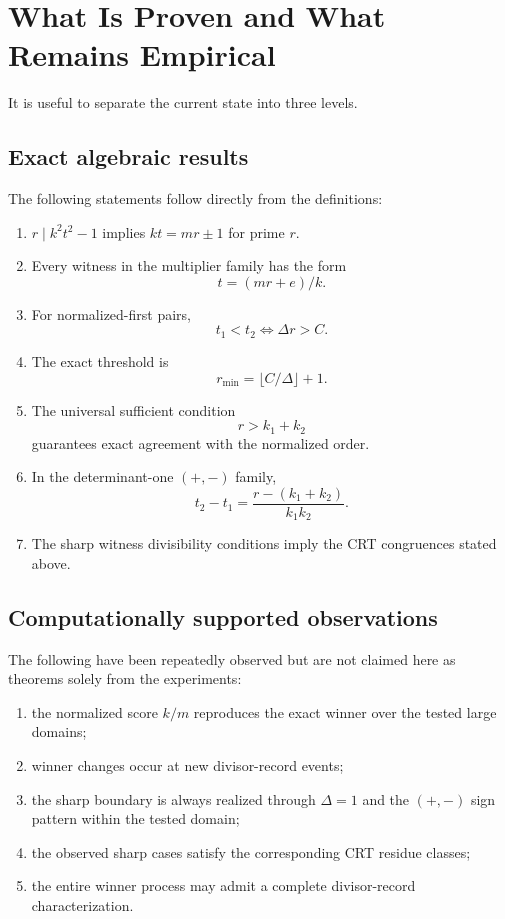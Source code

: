 \documentclass[11pt,a4paper]{article}
\begin{document}
\section{What Is Proven and What Remains Empirical}

It is useful to separate the current state into three levels.

\subsection{Exact algebraic results}
The following statements follow directly from the definitions:
\begin{enumerate}[leftmargin=2em]
    \item $r\mid k^2t^2-1$ implies $kt=mr\pm1$ for prime $r$.
    \item Every witness in the multiplier family has the form
    \[
        t=(mr+e)/k.
    \]
    \item For normalized-first pairs,
    \[
        t_1<t_2\iff \Delta r>C.
    \]
    \item The exact threshold is
    \[
        r_{\min}=\lfloor C/\Delta\rfloor+1.
    \]
    \item The universal sufficient condition
    \[
        r>k_1+k_2
    \]
    guarantees exact agreement with the normalized order.
    \item In the determinant-one $(+,-)$ family,
    \[
        t_2-t_1
        =
        \frac{r-(k_1+k_2)}{k_1k_2}.
    \]
    \item The sharp witness divisibility conditions imply the CRT congruences stated above.
\end{enumerate}

\subsection{Computationally supported observations}
The following have been repeatedly observed but are not claimed here as theorems solely from the experiments:
\begin{enumerate}[leftmargin=2em]
    \item the normalized score $k/m$ reproduces the exact winner over the tested large domains;
    \item winner changes occur at new divisor-record events;
    \item the sharp boundary is always realized through $\Delta=1$ and the $(+,-)$ sign pattern within the tested domain;
    \item the observed sharp cases satisfy the corresponding CRT residue classes;
    \item the entire winner process may admit a complete divisor-record characterization.
\end{enumerate}
\end{document}
